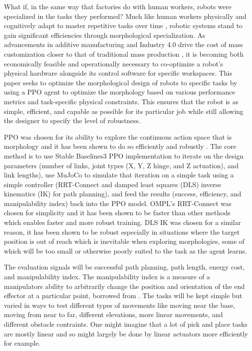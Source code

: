 \documentclass[defaultstyle,11pt]{thesis}
\begin{document}
What if, in the same way that factories do with human workers, robots were specialized in the tasks they performed?
Much like human workers physically and cognitively adapt to master repetitive tasks over time \cite{arany2008pgc1}\cite{mancuso2022effect}\cite{wu2020occupational}, robotic systems stand to gain significant efficiencies through morphological specialization. 
As advancements in additive manufacturing and Industry 4.0 drive the cost of mass customization closer to that of traditional mass production \cite{wang2017industry}\cite{baumers2019economics}, it is becoming both economically feasible and operationally necessary to co-optimize a robot's physical hardware alongside its control software for specific workspaces.
This paper seeks to optimize the morphological design of robots to specific tasks by using a PPO agent to optimize the morphology based on various performance metrics and task-specific physical constraints.
This ensures that the robot is as simple, efficient, and capable as possible for its particular job while still allowing the designer to specify the level of robustness.

PPO was chosen for its ability to explore the continuous action space that is morphology and it has been shown to do so efficiently and robustly \cite{schulman2017proximal}.
The core method is to use Stable Baselines3 PPO implementation to iterate on the design parameters (number of links, joint types (X, Y, Z hinge, and Z actuation), and link lengths), use MuJoCo to simulate that iteration on a simple task using a simple controller (RRT-Connect and damped least squares (DLS) inverse kinematics (IK) for path planning), and feed the results (success, efficiency, and manipulability index) back into the PPO model.
OMPL's RRT-Connect was chosen for simplicity and it has been shown to be faster than other methods \cite{kuffner2000rrt,sucan2012ompl} which enables faster and more robust training.
DLS IK was chosen for a similar reason, it has been shown to be robust especially in situations where the target position is out of reach \cite{buss2004introduction} which is inevitable when exploring morphologies, some of which will be too small or otherwise poorly suited to the task as the agent learns.

The evaluation signals will be successful path planning, path length, energy cost, and manipulability index.
The manipulability index is a measure of a manipulators ability to arbitrarily change the position and orientation of the end effector at a particular point, borrowed from \cite{yoshikawa1985manipulability}.
The tasks will be kept simple but varied in ways to test different types of movements like moving near the base, moving from near to far, different elevations, more linear movements, and different obstacle contraints.
One might imagine that a lot of pick and place tasks are mostly linear and so might largely be done by linear actuators more efficiently for example.
\end{document}
